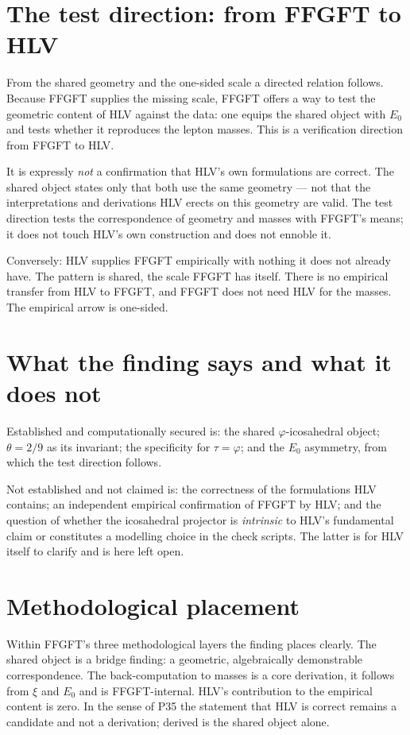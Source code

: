 \section{The test direction: from FFGFT to HLV}
From the shared geometry and the one-sided scale a directed relation follows. Because FFGFT
supplies the missing scale, FFGFT offers a way to test the geometric content of HLV against the
data: one equips the shared object with $E_0$ and tests whether it reproduces the lepton masses.
This is a verification direction from FFGFT to HLV.

It is expressly \emph{not} a confirmation that HLV's own formulations are correct. The shared
object states only that both use the same geometry --- not that the interpretations and
derivations HLV erects on this geometry are valid. The test direction tests the correspondence of
geometry and masses with FFGFT's means; it does not touch HLV's own construction and does not
ennoble it.

Conversely: HLV supplies FFGFT empirically with nothing it does not already have. The pattern is
shared, the scale FFGFT has itself. There is no empirical transfer from HLV to FFGFT, and FFGFT
does not need HLV for the masses. The empirical arrow is one-sided.

\section{What the finding says and what it does not}
Established and computationally secured is: the shared $\varphi$-icosahedral object; $\theta=2/9$
as its invariant; the specificity for $\tau=\varphi$; and the $E_0$ asymmetry, from which the
test direction follows.

Not established and not claimed is: the correctness of the formulations HLV contains; an
independent empirical confirmation of FFGFT by HLV; and the question of whether the icosahedral
projector is \emph{intrinsic} to HLV's fundamental claim or constitutes a modelling choice in the
check scripts. The latter is for HLV itself to clarify and is here left open.

\section{Methodological placement}
Within FFGFT's three methodological layers the finding places clearly. The shared object is a
bridge finding: a geometric, algebraically demonstrable correspondence. The back-computation to
masses is a core derivation, it follows from $\xi$ and $E_0$ and is FFGFT-internal. HLV's
contribution to the empirical content is zero. In the sense of P35 the statement that HLV is
correct remains a candidate and not a derivation; derived is the shared object alone.

